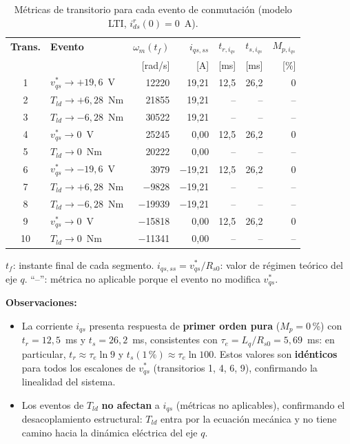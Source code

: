 \documentclass[12pt, a4paper,journal, onecolumn, compsoc]{IEEEtran}
\begin{document}
\begin{table}[H]
    \centering
    \caption{Métricas de transitorio para cada evento de conmutación (modelo LTI, $i_{ds}^r(0) = 0$~A).}
    \label{tab:metricas_trans}
    \renewcommand{\arraystretch}{1.15}
    \footnotesize
    \begin{tabular}{|c|l|r|r|r|r|r|}
        \hline
        \textbf{Trans.} & \textbf{Evento} & $\omega_m(t_f)$ & $i_{qs,ss}$ & $t_{r,i_{qs}}$ & $t_{s,i_{qs}}$ & $M_{p,i_{qs}}$ \\
         & & [rad/s] & [A] & [ms] & [ms] & [\%] \\
        \hline
        1 & $v_{qs}^* \to +19{,}6$~V   &  12220  & 19{,}21  & 12{,}5 & 26{,}2 & 0 \\
        2 & $T_{ld} \to +6{,}28$~Nm    &  21855  & 19{,}21  & --     & --     & -- \\
        3 & $T_{ld} \to -6{,}28$~Nm    &  30522  & 19{,}21  & --     & --     & -- \\
        4 & $v_{qs}^* \to 0$~V         &  25245  &  0{,}00  & 12{,}5 & 26{,}2 & 0 \\
        5 & $T_{ld} \to 0$~Nm          &  20222  &  0{,}00  & --     & --     & -- \\
        6 & $v_{qs}^* \to -19{,}6$~V   &   3979  & $-$19{,}21 & 12{,}5 & 26{,}2 & 0 \\
        7 & $T_{ld} \to +6{,}28$~Nm    &  $-$9828  & $-$19{,}21 & --     & --     & -- \\
        8 & $T_{ld} \to -6{,}28$~Nm    & $-$19939 & $-$19{,}21 & --     & --     & -- \\
        9 & $v_{qs}^* \to 0$~V         & $-$15818 &  0{,}00  & 12{,}5 & 26{,}2 & 0 \\
       10 & $T_{ld} \to 0$~Nm          & $-$11341 &  0{,}00  & --     & --     & -- \\
        \hline
    \end{tabular}

    \vspace{2mm}
    \scriptsize $t_f$: instante final de cada segmento. $i_{qs,ss}=v_{qs}^*/R_{s0}$: valor de régimen teórico del eje $q$. ``--'': métrica no aplicable porque el evento no modifica $v_{qs}^*$.
\end{table}

\textbf{Observaciones:}
\begin{itemize}
    \item La corriente $i_{qs}$ presenta respuesta de \textbf{primer orden pura} ($M_p = 0$\,\%) con $t_r = 12{,}5$~ms y $t_s = 26{,}2$~ms, consistentes con $\tau_e = L_q/R_{s0} = 5{,}69$~ms: en particular, $t_r \approx \tau_e \ln 9$ y $t_s(1\,\%) \approx \tau_e \ln 100$. Estos valores son \textbf{idénticos} para todos los escalones de $v_{qs}^*$ (transitorios 1, 4, 6, 9), confirmando la linealidad del sistema.

    \item Los eventos de $T_{ld}$ \textbf{no afectan} a $i_{qs}$ (métricas no aplicables), confirmando el desacoplamiento estructural: $T_{ld}$ entra por la ecuación mecánica y no tiene camino hacia la dinámica eléctrica del eje $q$.
\end{itemize}
\end{document}
